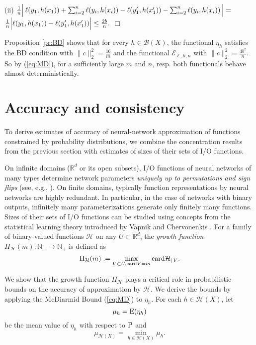\documentclass{elsarticle}
\def\n{\noindent}
\def\eop{\hfill $\Box$ \vspace{0.3 true cm}}
\def\card{{\rm card}}
\def\P{{\rm P}}
\def\E{{\rm E}}
\def\cE{{\mathcal E}}
\def\cH{{\mathcal H}}
\def\cB{{\mathcal B}}
\def\bR{{\mathbb R}}
\def\bN{{\mathbb N}}
\def\n{\noindent}
\def\card{{\rm card}}
\def\eop{\hfill $\Box$ \vspace{0.5cm}}
\begin{document}
(ii)
$ \frac{1}{n} \Bigl |\,  \ell(y_1, h(x_1)) + \sum_{i=2}^n  \ell(y_i,h(x_i)) - \ell(y'_1, h(x'_1)) - \sum_{i=2}^n  \ell(y_i,h(x_i)) \, \Bigr | =$\\
$ \frac{1}{n} \Bigl | \ell(y_1, h(x_1)) - \ell(y'_1, h(x'_1)) \Bigr |  \leq \frac{2b}{n}.$
\eop

\n Proposition \ref{pr:BD} shows that for every $h \in \cB(X)$, the functional $\eta_h$ satisfies the BD condition with $\| c\|^2_2= \frac{16}{m}$ and the functional $\cE_{\ell,h,n}$ with $\| c\|^2_2= \frac{4b^2}{n}$.
So by (\ref{eq:MD}), for a sufficiently large $m$ and $n$, resp. both functionals behave almost deterministically.



\section{Accuracy and consistency}
\label{sec:conc}

 To derive estimates of accuracy of neural-network approximation of functions constrained by probability distributions, we combine  the concentration results from the previous section with estimates of sizes of their sets of I/O functions.

On infinite domains ($\bR^d$ or its open subsets), I/O functions of neural networks of many types determine network parameters {\em uniquely up to permutations and sign flips} (see, e.g., \cite{su92,also93,vkka94,vkka96}).
On finite domains, typically function representations by neural networks  are highly redundant. In particular, in the case of networks with binary outputs, infinitely many parameterizations generate only finitely many functions.
Sizes of their sets of I/O functions can be studied using concepts from the statistical learning theory introduced by Vapnik and Chervonenkis \cite{vach71}. For a family of binary-valued functions $\cH$
on any $U \subset \bR^d$,  the {\em growth function} $\Pi_{\cH}(m): \bN_{+} \to \bN_{+}$ is defined  as
$$ \Pi_{\cH}(m) := \max_{V \subset U, \card V =m} \card \cH _{| \, V}.$$

We show that the growth function $\Pi_{\cH}$ plays a critical role in probabilistic bounds on the accuracy of approximation by $\cH$. We derive the bounds by  applying the McDiarmid Bound (\ref{eq:MD}) to $\eta_h$. For each $h \in \cH(X)$, let
$$\mu_h= \E(\eta_h)$$
\n be the mean value of $\eta_h$ with respect to $\P$ and
$$\mu_{\cH(X)}= \min_{h \in \cH(X)} \mu_h.$$
\end{document}
